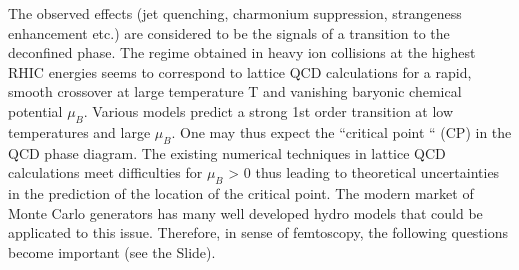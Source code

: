 \documentclass[dvipsnames] {beamer}
\begin{document}
\begin{frame}
{{      The observed effects (jet quenching, charmonium suppression,
      strangeness enhancement etc.) are considered to be the signals of
      a transition to the deconfined phase.
      The regime obtained in heavy ion collisions at the highest RHIC energies seems to correspond to lattice QCD calculations
      for a rapid, smooth crossover at large temperature T and vanishing baryonic chemical potential $\mu_{B}$.
      Various models predict a strong 1st order transition at low temperatures and large $\mu_{B}$.
      One may thus expect the ``critical point `` (CP) in the QCD phase diagram.
      The existing numerical techniques in lattice QCD calculations meet difficulties for $\mu_{B}$ > 0 thus leading to
      theoretical uncertainties in the prediction of the location of the critical point.
      The modern market of Monte Carlo generators has many well developed hydro models that could be applicated to this issue.
      Therefore, in sense of femtoscopy, the following questions become important (see the Slide).   
    }
  }
\end{frame}
\end{document}
